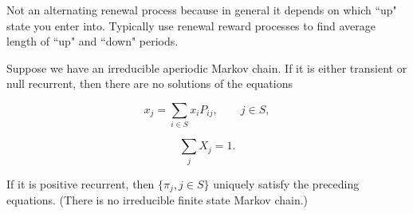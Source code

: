 \begin{example} Not an alternating renewal process because in general it depends on which ``up" state you enter into. Typically use renewal reward processes to find average length of ``up" and ``down" periods.

\end{example}

\begin{theorem}
Suppose we have an irreducible aperiodic Markov chain. If it is either transient or null recurrent, then there are no solutions of the equations

\[
x_j = \sum_{i \in S} x_i P_{ij}, \qquad j \in S,
\]

\[
\sum_j X_j = 1.
\]

If it is positive recurrent, then \(\{\pi_j, j \in S\}\) uniquely satisfy the preceding equations. (There is no irreducible finite state Markov chain.)


\end{theorem}

